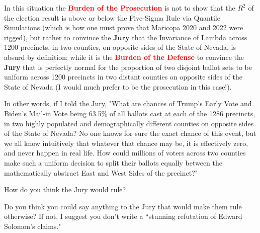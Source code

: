 \documentclass[preprint,13pt]{elsarticle}
\begin{document}
In this situation the \textbf{\textcolor{red}{Burden of the Prosecution}} is not to show that the $R^2$ of the election result is above or below the Five-Sigma Rule via Quantile Simulations (which is how one must prove that Maricopa 2020 and 2022 were rigged), but rather to convince the \textbf{Jury} that the Invariance of Lambda across 1200 precincts, in two counties, on opposite sides of the State of Nevada, is absurd by definition; while it is the \textbf{\textcolor{red}{Burden of the Defense}} to convince the \textbf{Jury} that is perfectly normal for the proportion of two disjoint ballot sets to be uniform across 1200 precincts in two distant counties on opposite sides of the State of Nevada (I would much prefer to be the prosecution in this case!).

In other words, if I told the Jury, "What are chances of Trump's Early Vote and Biden's Mail-in Vote being 63.5\% of all ballots cast at each of the 1286 precincts, in two highly populated and demographically different counties on opposite sides of the State of Nevada? No one knows for sure the exact chance of this event, but we all know intuitively that whatever that chance may be, it is effectively zero, and never happen in real life. How could millions of voters across two counties make such a uniform decision to split their ballots equally between the mathematically abstract East and West Sides of the precinct?" 

How do you think the Jury would rule?

Do you think you could say anything to the Jury that would make them rule otherwise? If not, I suggest you don't write a ``stunning refutation of Edward Solomon's claims."
\newpage
\end{document}
